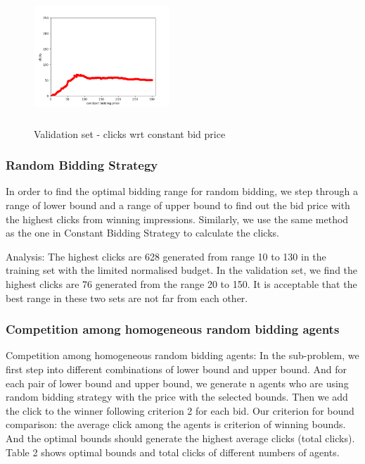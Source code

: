 \documentclass{sig-alternate-05-2015}
\begin{document}
\begin{figure}
\centering
\includegraphics[height=2in, width=2in]{images/constant_bidding_validation.png}
\caption{Validation set - clicks wrt constant bid price}
\end{figure}




\subsubsection{Random Bidding Strategy}
In order to find the optimal bidding range for random bidding, we step through a range of lower bound and a range of upper bound to find out the bid price with the highest clicks from winning impressions. Similarly, we use the same method as the one in Constant Bidding Strategy to calculate the clicks. 

Analysis: 
The highest clicks are 628 generated from range 10 to 130 in the training set with the limited normalised budget. In the validation set, we find the highest clicks are 76 generated from the range 20 to 150. It is acceptable that the best range in these two sets are not far from each other.


\subsubsection{Competition among homogeneous random bidding agents}

Competition among homogeneous random bidding agents:
In the sub-problem, we first step into different combinations of lower bound and upper bound. And for each pair of lower bound and upper bound, we generate n agents who are using random bidding strategy with the price with the selected bounds. Then we add the click to the winner following criterion 2 for each bid. 
Our criterion for bound comparison: the average click among the agents is criterion of winning bounds. And the optimal bounds should generate the highest average clicks (total clicks). Table 2 shows optimal bounds and total clicks of different numbers of agents. 
\end{document}
